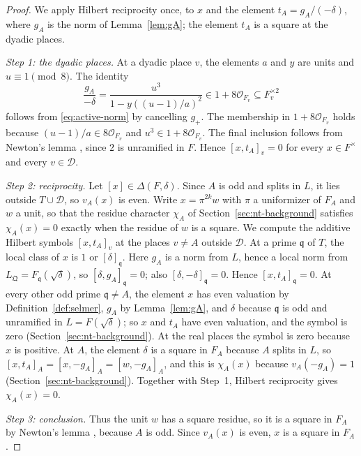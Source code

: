 \documentclass[11pt]{article}
\theoremstyle{plain}
\theoremstyle{definition}
\theoremstyle{remark}
\newcommand{\OO}{\mathcal O}
\begin{document}
\begin{proof}
We apply Hilbert reciprocity once, to $x$ and the element
$t_A=g_A/(-\delta)$, where $g_A$ is the norm of Lemma~\ref{lem:gA}; the
element $t_A$ is a square at the dyadic places.

\emph{Step 1: the dyadic places.}  At a dyadic place $v$, the elements $a$ and $y$ are units and $u\equiv1\pmod8$.  The
identity
\begin{equation}\label{eq:active-dyadic-square}
 \frac{g_A}{-\delta}
   =\frac{u^3}{1-y((u-1)/a)^2}
   \in1+8\OO_{F_v}\subseteq F_v^{\times2}
\end{equation}
follows from \eqref{eq:active-norm} by cancelling $g_+$.  The membership
in $1+8\OO_{F_v}$ holds because $(u-1)/a\in8\OO_{F_v}$ and
$u^3\in1+8\OO_{F_v}$.  The final inclusion follows from Newton's lemma
\cite[Theorem~7.32]{MilneANT}, since $2$ is unramified in $F$.  Hence
$[x,t_A]_v=0$ for every $x\in F^\times$ and every $v\in\mathcal D$.

\emph{Step 2: reciprocity.}  Let $[x]\in\Delta(F,\delta)$.  Since $A$ is
odd and splits in $L$, it lies outside $T\cup\mathcal D$, so $v_A(x)$ is
even.  Write $x=\pi^{2k}w$ with $\pi$ a uniformizer of $F_A$ and $w$ a
unit, so that the residue character $\chi_A$ of
Section~\ref{sec:nt-background} satisfies $\chi_A(x)=0$ exactly when the
residue of $w$ is a square.  We compute the additive Hilbert symbols
$[x,t_A]_v$ at the places $v\ne A$ outside $\mathcal D$.  At a prime
$\mathfrak q$ of $T$, the local class of $x$ is $1$ or
$[\delta]_{\mathfrak q}$.  Here $g_A$ is a norm from $L$, hence a local
norm from $L_{\mathfrak Q}=F_{\mathfrak q}(\sqrt\delta)$, so
$[\delta,g_A]_{\mathfrak q}=0$; also $[\delta,-\delta]_{\mathfrak q}=0$.
Hence $[x,t_A]_{\mathfrak q}=0$.  At every other odd prime
$\mathfrak q\ne A$, the element $x$ has even valuation by
Definition~\ref{def:selmer}, $g_A$ by Lemma~\ref{lem:gA}, and $\delta$
because $\mathfrak q$ is odd and unramified in $L=F(\sqrt\delta)$; so $x$
and $t_A$ have even valuation, and the symbol is zero
(Section~\ref{sec:nt-background}).  At the real places the symbol is
zero because $x$ is positive.  At $A$, the element $\delta$ is a square
in $F_A$ because $A$ splits in $L$, so $[x,t_A]_A=[x,-g_A]_A=[w,-g_A]_A$,
and this is $\chi_A(x)$ because $v_A(-g_A)=1$
(Section~\ref{sec:nt-background}).  Together with Step~1, Hilbert
reciprocity \cite[Chapter~V, Example~5.4]{MilneCFT} gives
$\chi_A(x)=0$.

\emph{Step 3: conclusion.}  Thus the unit $w$ has a square residue, so it
is a square in $F_A$ by Newton's lemma \cite[Theorem~7.32]{MilneANT},
because $A$ is odd.  Since $v_A(x)$ is even, $x$ is a square in $F_A$.
\end{proof}
\end{document}
